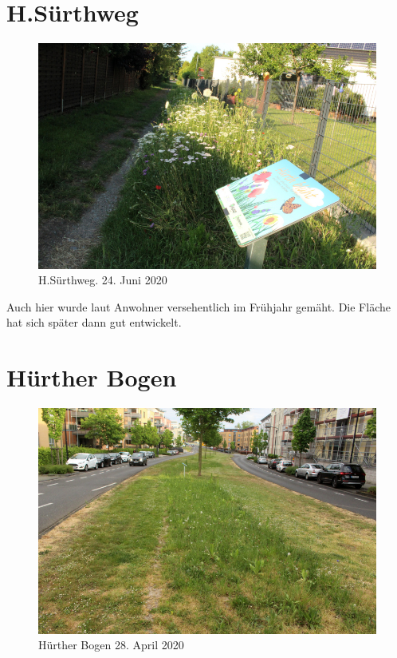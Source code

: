 \documentclass[10pt]{article}
\begin{document}
\section{H.Sürthweg}
\begin{figure}[h!]
  \includegraphics[width=\linewidth]{img/suerthweg/juni.jpg}
  \caption{H.Sürthweg. 24. Juni 2020}
\end{figure}

Auch hier wurde laut Anwohner versehentlich im Frühjahr gemäht.
Die Fläche hat sich später dann gut entwickelt. 

\clearpage
\section{Hürther Bogen}
\begin{figure}[h!]
  \includegraphics[width=0.95\linewidth]{img/bogen/april.jpg}
  \caption{Hürther Bogen 28. April 2020}
\end{figure}
\end{document}
